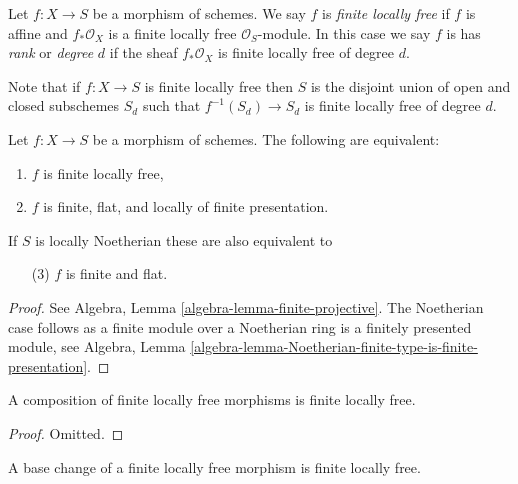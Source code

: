 \begin{definition}
\label{definition-finite-locally-free}
Let $f : X \to S$ be a morphism of schemes.
We say $f$ is {\it finite locally free} if $f$ is
affine and $f_*\mathcal{O}_X$ is a finite locally
free $\mathcal{O}_S$-module. In this case we say $f$ is
has {\it rank} or {\it degree} $d$
if the sheaf $f_*\mathcal{O}_X$ is finite locally free of degree $d$.
\end{definition}

\noindent
Note that if $f : X \to S$ is finite locally free then $S$ is the disjoint
union of open and closed subschemes $S_d$ such that $f^{-1}(S_d) \to S_d$
is finite locally free of degree $d$.

\begin{lemma}
\label{lemma-finite-flat}
Let $f : X \to S$ be a morphism of schemes.
The following are equivalent:
\begin{enumerate}
\item $f$ is finite locally free,
\item $f$ is finite, flat, and locally of finite presentation.
\end{enumerate}
If $S$ is locally Noetherian these are also equivalent to
\begin{enumerate}
\item[(3)] $f$ is finite and flat.
\end{enumerate}
\end{lemma}

\begin{proof}
See Algebra, Lemma \ref{algebra-lemma-finite-projective}.
The Noetherian case follows as a finite module
over a Noetherian ring is a finitely presented module, see
Algebra,
Lemma \ref{algebra-lemma-Noetherian-finite-type-is-finite-presentation}.
\end{proof}

\begin{lemma}
\label{lemma-composition-finite-locally-free}
A composition of finite locally free morphisms is finite locally free.
\end{lemma}

\begin{proof}
Omitted.
\end{proof}

\begin{lemma}
\label{lemma-base-change-finite-locally-free}
A base change of a finite locally free morphism is finite locally free.
\end{lemma}

